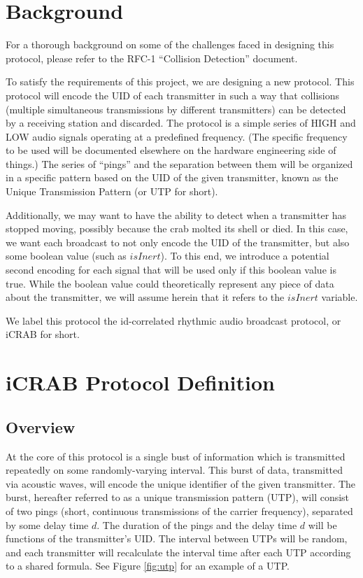 \documentclass[12pt]{article}
\begin{document}
\section{Background} \label{background}

For a thorough background on some of the challenges faced in designing this
protocol, please refer to the RFC-1 ``Collision Detection'' document.

To satisfy the requirements of this project, we are designing a new protocol.
This protocol will encode the UID of each transmitter in such a way that
collisions (multiple simultaneous transmissions by different transmitters) can
be detected by a receiving station and discarded.
The protocol is a simple
series of HIGH and LOW audio signals operating at a predefined
frequency. (The specific frequency to be used will be documented elsewhere
on the hardware engineering side of things.)
The series of ``pings'' and the separation between them will be organized in a
specific pattern based on the UID of the given transmitter, known as the
Unique Transmission Pattern (or UTP for short).

Additionally, we may want to have the ability to detect when a transmitter
has stopped moving, possibly because the crab molted its shell or died.
In this case, we want each broadcast to not only encode the UID of the
transmitter, but also some boolean value (such as $isInert$).
To this end, we introduce a potential second encoding for each signal that
will be used only if this boolean value is true.
While the boolean value could theoretically represent any piece of data about
the transmitter, we will assume herein that it refers to the $isInert$
variable.

We label this protocol the id-correlated rhythmic audio broadcast protocol,
or iCRAB for short.

\section{iCRAB Protocol Definition} \label{protocol-def}

\subsection{Overview}

At the core of this protocol is a single bust of information which is
transmitted repeatedly on some randomly-varying interval.
This burst of data, transmitted via acoustic waves, will encode the unique
identifier of the given transmitter. The burst, hereafter referred to as a
unique transmission pattern (UTP), will consist of two pings (short, continuous
transmissions of the carrier frequency), separated by some delay time $d$.
The duration of the pings and the delay time $d$ will be functions of the
transmitter's UID.
The interval between UTPs will be random, and each transmitter will recalculate
the interval time after each UTP according to a shared formula.
See Figure \ref{fig:utp} for an example of a UTP.
\end{document}
